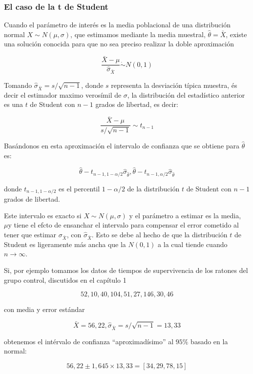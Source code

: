 \documentclass[
]{article}
\begin{document}
\subsubsection{El caso de la t de Student}\label{el-caso-de-la-t-de-student}

Cuando el parámetro de interés es la media poblacional de una distribución normal \(X \sim N(\mu, \sigma)\), que estimamos mediante la media muestral, \(\hat{\theta}=\bar{X}\), existe una solución conocida para que no sea preciso realizar la doble aproximación

\[
\frac{\bar{X}-\mu}{\hat{\sigma}_{\bar{X}}} \dot{\sim} N(0,1)
\]

Tomando \(\hat{\sigma}_{\bar{X}}=s / \sqrt{n-1}\), donde \(s\) representa la desviación típica muestra, és decir el estimador maximo verosímil de \(\sigma\), la distribución del estadístico anterior es una \(t\) de Student con \(n-1\) grados de libertad, es decir:

\[
\frac{\bar{X}-\mu}{s / \sqrt{n-1}} \sim t_{n-1}
\]

Basándonos en esta aproximación el intervalo de confianza que se obtiene para \(\hat{\theta}\) es:

\[
\hat{\theta}-t_{n-1,1-\alpha / 2} \hat{\sigma}_{\hat{\theta}}, \hat{\theta}-t_{n-1, \alpha / 2} \hat{\sigma}_{\hat{\theta}}
\]

donde \(t_{n-1,1-\alpha / 2}\) es el percentil \(1-\alpha / 2\) de la distribución \(t\) de Student con \(n-1\) grados de libertad.

Este intervalo es exacto si \(X \sim N(\mu, \sigma)\) y el parámetro a estimar es la media, \(\mu \mathrm{y}\) tiene el efcto de ensanchar el intervalo para compensar el error cometido al tener que estimar \(\sigma_{\bar{X}}\), con \(\hat{\sigma}_{\bar{X}}\). Esto se debe al hecho de que la distribución \(t\) de Student es ligeramente más ancha que la \(N(0,1)\) a la cual tiende cuando \(n \rightarrow \infty\).

Si, por ejemplo tomamos los datos de tiempos de supervivencia de los ratones del grupo control, discutidos en el capítulo 1

\[
52,10,40,104,51,27,146,30,46
\]

con media y error estándar

\[
\bar{X}=56,22, \hat{\sigma}_{\bar{X}}=s / \sqrt{n-1}=13,33
\]

obtenemos el intérvalo de confianza ``aproximadísimo'' al \(95 \%\) basado en la normal:

\[
56,22 \pm 1,645 \times 13,33=[34,29,78,15]
\]
\end{document}
